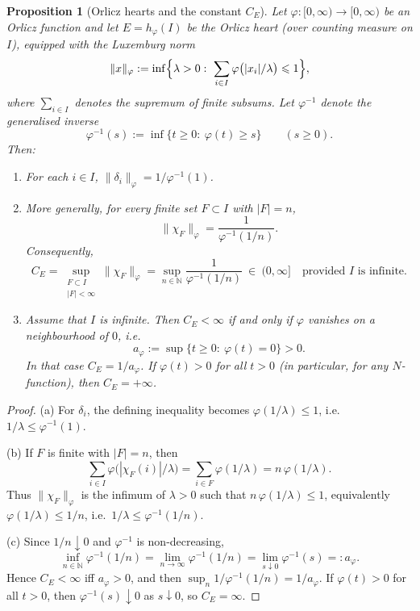 \documentclass[reqno]{amsart}
\theoremstyle{plain}
\newtheorem{proposition}[theorem]{Proposition}
\theoremstyle{definition}
\theoremstyle{remark}
\renewcommand{\le}{\leqslant}
\renewcommand{\ge}{\geqslant}
\begin{document}
\begin{proposition}[Orlicz hearts and the constant $C_E$]\label{prop:orlicz-CE}
Let $\varphi\colon [0,\infty)\to[0,\infty)$ be an Orlicz function and let $E=h_\varphi(I)$ be the Orlicz
heart (over counting measure on $I$), equipped with the Luxemburg norm
\[
\|x\|_{\varphi}:=\inf\Bigl\{\lambda>0:\ \sum_{i\in I}\varphi\bigl(|x_i|/\lambda\bigr)\le 1\Bigr\},
\]
where $\sum_{i\in I}$ denotes the supremum of finite subsums. Let $\varphi^{-1}$ denote the generalised inverse
\[
\varphi^{-1}(s):=\inf\{t\ge 0:\ \varphi(t)\ge s\}\qquad (s\ge 0).
\]
Then:
\begin{enumerate}[label={\rm(\alph*)}]
\item For each $i\in I$, $\|\delta_i\|_{\varphi}=1/\varphi^{-1}(1)$.
\item More generally, for every finite set $F\subset I$ with $|F|=n$,
\[
\|\chi_F\|_{\varphi}=\frac{1}{\varphi^{-1}(1/n)}.
\]
Consequently,
\[
C_E
=\sup_{\substack{F\subset I\\ |F|<\infty}}\|\chi_F\|_{\varphi}
=\sup_{n\in\mathbb{N}} \frac{1}{\varphi^{-1}(1/n)}\ \in\ (0,\infty]
\quad\text{provided $I$ is infinite.}
\]
\item Assume that $I$ is infinite. Then $C_E<\infty$ if and only if $\varphi$ vanishes on a neighbourhood of $0$, i.e.
\[
a_\varphi:=\sup\{t\ge 0:\ \varphi(t)=0\}>0.
\]
In that case $C_E=1/a_\varphi$. If $\varphi(t)>0$ for all $t>0$ (in particular, for any $N$-function), then $C_E=+\infty$.
\end{enumerate}
\end{proposition}

\begin{proof}
(a) For $\delta_i$, the defining inequality becomes $\varphi(1/\lambda)\le 1$, i.e.\ $1/\lambda\le \varphi^{-1}(1)$.

(b) If $F$ is finite with $|F|=n$, then
\[
\sum_{i\in I}\varphi\bigl(|\chi_F(i)|/\lambda\bigr)=\sum_{i\in F}\varphi(1/\lambda)=n\,\varphi(1/\lambda).
\]
Thus $\|\chi_F\|_\varphi$ is the infimum of $\lambda>0$ such that $n\,\varphi(1/\lambda)\le 1$,
equivalently $\varphi(1/\lambda)\le 1/n$, i.e.\ $1/\lambda\le \varphi^{-1}(1/n)$.

(c) Since $1/n\downarrow 0$ and $\varphi^{-1}$ is non-decreasing,
\[
\inf_{n\in\mathbb N}\varphi^{-1}(1/n)=\lim_{n\to\infty}\varphi^{-1}(1/n)=\lim_{s\downarrow 0}\varphi^{-1}(s)=:a_\varphi.
\]
Hence $C_E<\infty$ iff $a_\varphi>0$, and then $\sup_n 1/\varphi^{-1}(1/n)=1/a_\varphi$.
If $\varphi(t)>0$ for all $t>0$, then $\varphi^{-1}(s)\downarrow 0$ as $s\downarrow 0$, so $C_E=\infty$.
\end{proof}
\end{document}
